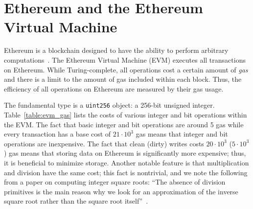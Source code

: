 \section{Ethereum and the Ethereum Virtual Machine}

Ethereum is a blockchain designed to have the ability
to perform arbitrary computations~\cite{EthereumYellowpaper}.
The Ethereum Virtual Machine (EVM) executes all transactions on Ethereum.
While Turing-complete,
all operations cost a certain amount of \emph{gas}
and there is a limit to the amount of gas included within each block.
Thus, the efficiency of all operations on Ethereum
are measured by their gas usage.

The fundamental type is a \texttt{uint256} object:
a 256-bit unsigned integer.
Table~\ref{table:evm_gas} lists the costs of various
integer and bit operations within the EVM.
The fact that basic integer and bit operations are around 5 gas
while every transaction has a base cost of $21\cdot10^{3}$ gas
means that integer and bit operations are inexpensive.
The fact that clean (dirty) writes costs $20\cdot10^{3}$ ($5\cdot10^{3}$) gas
means that storing data on Ethereum is significantly more expensive;
thus, it is beneficial to minimize storage.
Another notable feature is that multiplication and division
have the same cost;
this fact is nontrivial,
and we note the following from a paper on computing integer square roots:
``The absence of division primitives is the main reason why we look
for an approximation of the inverse square root rather than the
square root itself''~\cite[Section 2]{FormalVerIsqrt}.


